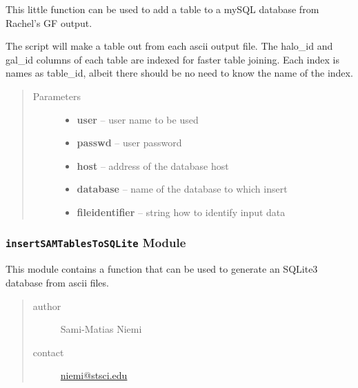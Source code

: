 \documentclass[letterpaper,10pt,english]{sphinxmanual}
\begin{document}
\begin{fulllineitems}
\label{SamPy.db:SamPy.db.insertSAMTablesToMySQL.addToMySQLDBfromSAMTables}
This little function can be used to add a table to a
mySQL database from Rachel's GF output.

The script will make a table out from each ascii 
output file. The halo\_id and gal\_id columns of
each table are indexed for faster table joining.
Each index is names as table\_id, albeit there
should be no need to know the name of the index.
\begin{quote}\begin{description}
\item[{Parameters}] \leavevmode\begin{itemize}
\item {} 
\textbf{user} -- user name to be used

\item {} 
\textbf{passwd} -- user password

\item {} 
\textbf{host} -- address of the database host

\item {} 
\textbf{database} -- name of the database to which insert

\item {} 
\textbf{fileidentifier} -- string how to identify input data

\end{itemize}

\end{description}\end{quote}

\end{fulllineitems}



\subsubsection{\texttt{insertSAMTablesToSQLite} Module}
\label{SamPy.db:module-SamPy.db.insertSAMTablesToSQLite}\label{SamPy.db:insertsamtablestosqlite-module}
This module contains a function that can be used to
generate an SQLite3 database from ascii files.
\begin{quote}\begin{description}
\item[{author}] \leavevmode
Sami-Matias Niemi

\item[{contact}] \leavevmode
\href{mailto:niemi@stsci.edu}{niemi@stsci.edu}

\end{description}\end{quote}
\end{document}
